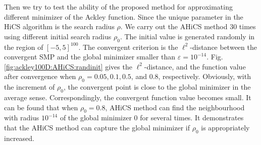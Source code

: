 \documentclass[final,1p,times]{elsarticle}
\begin{document}
Then we try to test the ability of the proposed method for 
approximating different minimizer of the Ackley function.
Since the unique parameter in the HiCS algorithm is the
search radius $\rho$. 
We carry out the AHiCS method $30$ times using different 
initial search radius $\rho_0$. The initial value is generated
randomly in the region of $[-5,5]^{100}$. 
The convergent criterion is the $\ell^2$-distance between the
convergent SMP and the global minimizer smaller than
$\varepsilon=10^{-14}$.
Fig.\,\ref{fig:ackley100D:AHiCS:randinit} gives the 
$\ell^2$-distance, and
the function value after convergence when $\rho_0=0.05, 0.1, 0.5$,
and $0.8$, respectively. Obviously, with the increment of $\rho_0$,
the convergent point is close to the global minimizer in the
average sense. Correspondingly, the convergent function value
becomes small. It can be found that when $\rho_0=0.8$, AHiCS
method can find the neighbourhood with radius $10^{-14}$ of the
global minimizer $0$ for several times. 
It demonstrates that the AHiCS method can capture the global minimizer
if $\rho_0$ is appropriately increased. 
\end{document}
